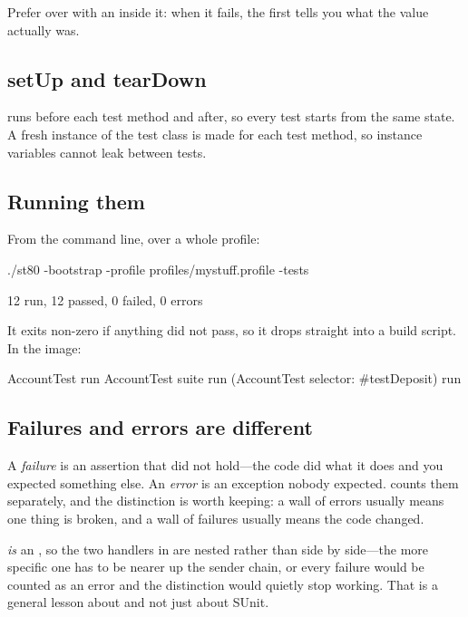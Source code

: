 Prefer  over  with an \ct{=} inside it: when it
fails, the first tells you what the value actually was.

\subsection{setUp and tearDown}

 runs before each test method and  after, so every test
starts from the same state. A fresh instance of the test class is made for
each test method, so instance variables cannot leak between tests.

\subsection{Running them}

From the command line, over a whole profile:

\begin{sh}
./st80 -bootstrap -profile profiles/mystuff.profile -tests
\end{sh}

\begin{plain}
12 run, 12 passed, 0 failed, 0 errors
\end{plain}

It exits non-zero if anything did not pass, so it drops straight into a
build script. In the image:

\begin{st}
AccountTest run
AccountTest suite run
(AccountTest selector: #testDeposit) run
\end{st}

\subsection{Failures and errors are different}

A \emph{failure} is an assertion that did not hold---the code did what it does
and you expected something else. An \emph{error} is an exception nobody
expected.  counts them separately, and the distinction is worth
keeping: a wall of errors usually means one thing is broken, and a wall of
failures usually means the code changed.

\begin{stnote}
 \emph{is} an , so the two handlers in
 are nested rather than side by side---the more specific one
has to be nearer up the sender chain, or every failure would be counted as an
error and the distinction would quietly stop working. That is a general lesson
about  and not just about SUnit.
\end{stnote}


